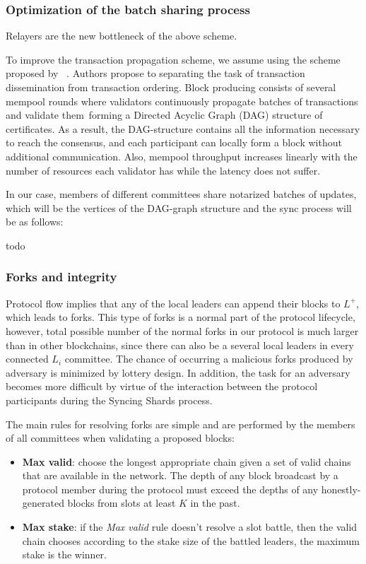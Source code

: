 \subsubsection{Optimization of the batch sharing process}

Relayers are the new bottleneck of the above scheme.

To improve the transaction propagation scheme, we assume using the scheme proposed by ~\cite{danezis2022narwhal}.
Authors propose to separating the task of transaction dissemination from transaction ordering.
Block producing consists of several mempool rounds where validators continuously propagate batches of transactions and validate them\
forming a Directed Acyclic Graph (DAG) structure of certificates.
As a result, the DAG-structure contains all the information necessary to reach the consensus, and each participant can locally form a block without additional communication.
Also, mempool throughput increases linearly with the number of resources each validator has while the latency does not suffer.

In our case, members of different committees share notarized batches of updates, which will be the vertices of the DAG-graph structure
and the sync process will be as follows:

todo

\subsubsection{Forks and integrity}\label{subsec:resolving-forks}

Protocol flow implies that any of the local leaders can append their blocks to $L^+$, which leads to forks.
This type of forks is a normal part of the protocol lifecycle, however, total possible number of the normal forks in our protocol is much larger than in other blockchains, since there can also be a several local leaders in every connected $L_i$ committee.
The chance of occurring a malicious forks produced by adversary is minimized by lottery design.
In addition, the task for an adversary becomes more difficult by virtue of the interaction between the protocol participants during the Syncing Shards process.

The main rules for resolving forks are simple and are performed by the members of all committees when validating a proposed blocks:
\begin{itemize}
    \item \textbf{Max valid}: choose the longest appropriate chain given a set of valid chains that are available in the network.
    The depth of any block broadcast by a protocol member during the protocol must exceed the depths of any honestly-generated blocks from slots at least $K$ in the past.
    \item \textbf{Max stake}: if the \emph{Max valid} rule doesn't resolve a slot battle, then the valid chain chooses according to the stake size of the battled leaders, the maximum stake is the winner.
\end{itemize}

